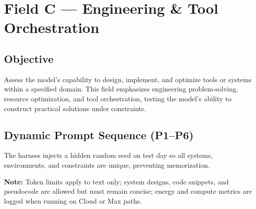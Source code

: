 \section{Field C — Engineering \& Tool Orchestration}
\label{sec:fieldC}

\subsection*{Objective}
Assess the model’s capability to design, implement, and optimize tools or systems within a specified domain. This field emphasizes engineering problem-solving, resource optimization, and tool orchestration, testing the model’s ability to construct practical solutions under constraints.

\subsection*{Dynamic Prompt Sequence (P1–P6)}
The harness injects a hidden random seed on test day so all systems, environments, and constraints are unique, preventing memorization.

\textbf{Note:} Token limits apply to text only; system designs, code snippets, and pseudocode are allowed but must remain concise; energy and compute metrics are logged when running on Cloud or Max paths.

